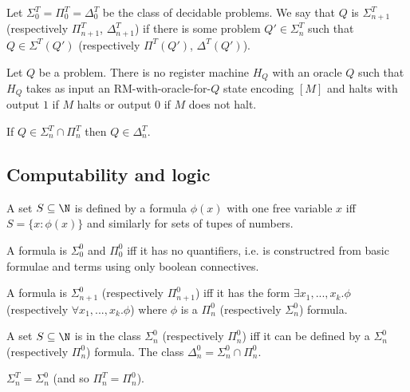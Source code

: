 \documentclass{article}
\begin{document}
\begin{definition}
    Let $\Sigma_0^T=\Pi^T_0=\Delta^T_0$ be the class of decidable problems. We say 
    that $Q$ is $\Sigma_{n+1}^T$ (respectively $\Pi_{n+1}^T$, $\Delta_{n+1}^T$)
    if there is some problem $Q'\in\Sigma_n^T$ such that $Q\in\Sigma^T(Q')$
    (respectively $\Pi^T(Q')$, $\Delta^T(Q')$).
\end{definition}

\begin{definition}
    Let $Q$ be a problem. There is no register machine $H_Q$ with an oracle $Q$ 
    such that $H_Q$ takes as input an RM-with-oracle-for-$Q$ state encoding 
    $[M]$ and halts with output $1$ if $M$ halts or output $0$ if $M$ does not halt.
\end{definition}

\begin{theorem}
    If $Q\in\Sigma_n^T\cap\Pi_n^T$ then $Q\in\Delta^T_n$.
\end{theorem}

\subsection{Computability and logic}

\begin{definition}
    A set $S\subseteq\N$ is defined by a formula $\phi(x)$ with one free variable
    $x$ iff $S=\{x:\phi(x)\}$ and similarly for sets of tupes of numbers.
\end{definition}

\begin{definition}
    A formula is $\Sigma_0^0$ and $\Pi_0^0$ iff it has no quantifiers, i.e. is 
    constructred from basic formulae and terms using only boolean connectives.

    A formula is $\Sigma_{n+1}^0$ (respectively $\Pi_{n+1}^0$) iff it has the form 
    $\exists x_1,...,x_k.\phi$ (respectively $\forall x_1,...,x_k.\phi$) where
    $\phi$ is a $\Pi_n^0$ (respectively $\Sigma_n^0$) formula.
\end{definition}

\begin{definition}
    A set $S\subseteq\N$ is in the class $\Sigma_n^0$ (respectively $\Pi_n^0$)
    iff it can be defined by a $\Sigma_n^0$ (respectively $\Pi_n^0$)
    formula. The class $\Delta_n^0 = \Sigma_n^0\cap\Pi_n^0$.
\end{definition}

\begin{theorem}[Notes I.40]
    $\Sigma_n^T=\Sigma_n^0$ (and so $\Pi_n^T=\Pi_n^0$). 
\end{theorem}
\end{document}
